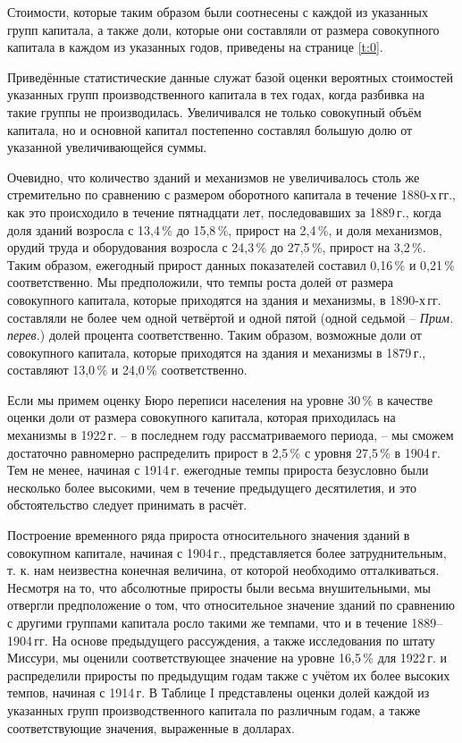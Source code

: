 \documentclass[leqno]{article}  %
\begin{document}
\par
Стоимости, которые таким образом были соотнесены с каждой из указанных групп капитала, а также доли, которые они составляли от размера совокупного капитала в каждом из указанных годов, приведены на странице \vref{t:0}.
\par
Приведённые статистические данные служат базой оценки вероятных стоимостей указанных групп производственного капитала в тех годах, когда разбивка на такие группы не производилась. Увеличивался не только совокупный объём капитала, но и основной капитал постепенно составлял большую долю от указанной увеличивающейся суммы.
\par
Очевидно, что количество зданий и механизмов не увеличивалось столь же стремительно по сравнению с размером оборотного капитала в течение 1880-х\,гг., как это происходило в течение пятнадцати лет, последовавших за 1889\,г., когда доля зданий возросла с 13,4\,\% до 15,8\,\%, прирост на 2,4\,\%, и доля механизмов, орудий труда и оборудования возросла с 24,3\,\% до 27,5\,\%, прирост на 3,2\,\%. Таким образом, ежегодный прирост данных показателей составил 0,16\,\% и 0,21\,\% соответственно. Мы предположили, что темпы роста долей от размера совокупного капитала, которые приходятся на здания и механизмы, в 1890-х\,гг. составляли не более чем одной четвёртой и одной пятой (одной седьмой -- \emph{Прим. перев.}) долей процента соответственно. Таким образом, возможные доли от совокупного капитала, которые приходятся на здания и механизмы в 1879\,г., составляют 13,0\,\% и 24,0\,\% соответственно.
\par
Если мы примем оценку Бюро переписи населения на уровне 30\,\% в качестве оценки доли от размера совокупного капитала, которая приходилась на механизмы в 1922\,г. -- в последнем году рассматриваемого периода, -- мы сможем достаточно равномерно распределить прирост в 2,5\,\% с уровня 27,5\,\% в 1904\,г. Тем не менее, начиная с 1914\,г. ежегодные темпы прироста безусловно были несколько более высокими, чем в течение предыдущего десятилетия, и это обстоятельство следует принимать в расчёт.
\par
Построение временного ряда прироста относительного значения зданий в совокупном капитале, начиная с 1904\,г., представляется более затруднительным, т. к. нам неизвестна конечная величина, от которой необходимо отталкиваться. Несмотря на то, что абсолютные приросты были весьма внушительными, мы отвергли предположение о том, что относительное значение зданий по сравнению с другими группами капитала росло такими же темпами, что и в течение 1889--1904\,гг. На основе предыдущего рассуждения, а также исследования по штату Миссури, мы оценили соответствующее значение на уровне 16,5\,\% для 1922\,г. и распределили приросты по предыдущим годам также с учётом их более высоких темпов, начиная с 1914\,г. В Таблице I представлены оценки долей каждой из указанных групп производственного капитала по различным годам, а также соответствующие значения, выраженные в долларах.
\end{document}
